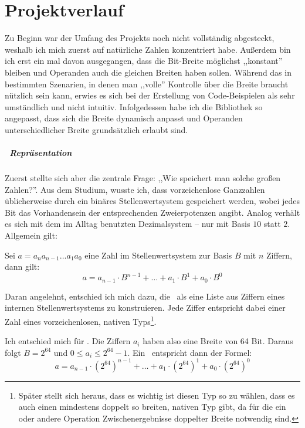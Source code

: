 \section{Projektverlauf}
Zu Beginn war der Umfang des Projekts noch nicht vollständig abgesteckt, weshalb ich mich zuerst auf natürliche Zahlen konzentriert habe. Außerdem bin ich erst ein mal davon ausgegangen, dass die Bit-Breite möglichst ,,konstant'' bleiben und Operanden auch die gleichen Breiten haben sollen.
Während das in bestimmten Szenarien, in denen man ,,volle'' Kontrolle über die Breite braucht nützlich sein kann, erwies es sich bei der Erstellung von Code-Beispielen als sehr umständlich und nicht intuitiv. Infolgedessen habe ich die Bibliothek so angepasst, dass sich die Breite dynamisch anpasst und Operanden unterschiedlicher Breite grundsätzlich erlaubt sind.


\subparagraph*{\mpi\ Repräsentation}
Zuerst stellte sich aber die zentrale Frage: ,,Wie speichert man solche großen Zahlen?''.
Aus dem Studium, wusste ich, dass vorzeichenlose Ganzzahlen üblicherweise durch ein binäres Stellenwertsystem gespeichert werden, wobei jedes Bit das Vorhandensein der entsprechenden Zweierpotenzen angibt.
Analog verhält es sich mit dem im Alltag benutzten Dezimalsystem -- nur mit Basis $10$ statt $2$. Allgemein gilt:

Sei $a=a_{n}a_{n-1}\dots{}a_{1}a_{0}$ eine Zahl im Stellenwertsystem zur Basis $B$ mit $n$ Ziffern, dann gilt:
\begin{equation}
a = a_{n-1} \cdot B^{n-1} + \dots{} + a_{1} \cdot B^{1} + a_{0} \cdot B^{0}
\end{equation}

Daran angelehnt, entschied ich mich dazu, die \mpi\ als eine Liste aus Ziffern eines internen Stellenwertsystems zu konstruieren.
Jede Ziffer entspricht dabei einer Zahl eines vorzeichenlosen, nativen Typs\footnote{Später stellt sich heraus, dass es wichtig ist diesen Typ so zu wählen, dass es auch einen mindestens doppelt so breiten, nativen Typ gibt, da für die ein oder andere Operation Zwischenergebnisse doppelter Breite notwendig sind.}.


Ich entschied mich für . Die Ziffern $a_i$ haben also eine Breite von 64 Bit.
Daraus folgt $B = 2^{64}$ und $0 \le a_i \le 2^{64} - 1$.
Ein \mpi\ entspricht dann der Formel:
\begin{equation}
a = a_{n-1} \cdot (2^{64})^{n-1} + \dots{} + a_{1} \cdot (2^{64})^{1} + a_{0} \cdot (2^{64})^{0}
\end{equation}

